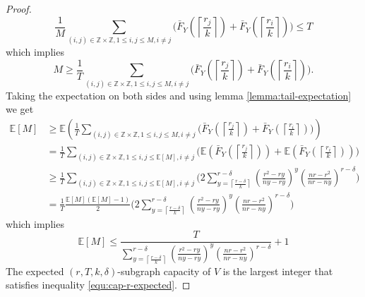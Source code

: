 \documentclass[10pt]{extarticle}
\newcommand{\Z}{\mathbb{Z}}
\theoremstyle{definition}
\begin{document}
\begin{proof}
\begin{equation*}
      \frac{1}{M} \sum_{(i,j) \in \Z\times\Z, 1 \le i,j \le M, i \ne j}  \Biggl( \bar{F}_Y\left(\left\lceil \frac{r_j}{k} \right\rceil\right) + \bar{F}_Y\left(\left\lceil \frac{r_i}{k} \right\rceil\right) \Biggr)  \le T 
\end{equation*}
\noindent which implies
\begin{equation}
\label{equ:cap-r}      
       M \geq \frac{1}{T}\sum_{(i,j) \in \Z\times\Z, 1 \le i,j \le M, i \ne j}  \Biggl( \bar{F}_Y\left(\left\lceil \frac{r_j}{k} \right\rceil\right) + \bar{F}_Y\left(\left\lceil \frac{r_i}{k} \right\rceil\right)\Biggr). 
\end{equation}
Taking the expectation on both sides and using lemma \ref{lemma:tail-expectation} we get
\begin{equation}
    \begin{split}
           \mathbb{E}[M] &\geq \mathbb{E} \left(\frac{1}{T}\sum_{(i,j) \in \Z\times\Z, 1 \le i,j \le M, i \ne j}  \Biggl( \bar{F}_Y\left(\left\lceil \frac{r_j}{k} \right\rceil\right) + \bar{F}_Y\left(\left\lceil \frac{r_i}{k} \right\rceil\right)\Biggr) \right) \\&= 
           \frac{1}{T}\sum_{(i,j) \in \Z\times\Z, 1 \le i,j \le \mathbb{E}[M], i \ne j}  \Biggl( \mathbb{E} \left( \bar{F}_Y\left(\left\lceil \frac{r_j}{k} \right\rceil\right) \right) + \mathbb{E} \left( \bar{F}_Y\left(\left\lceil \frac{r_i}{k} \right\rceil\right) \right)\Biggr) \\
           &\ge
           \frac{1}{T}\sum_{(i,j) \in \Z\times\Z, 1 \le i,j \le \mathbb{E}[M], i \ne j}  \Biggl( 2 \sum_{y = \left\lceil \frac{r-\delta}{k} \right\rceil}^{r-\delta}
           \left(\frac{r^2 - ry}{ny-ry}\right)^{y} \left(\frac{nr-r^2}{nr-ny}\right)^{r-\delta}\Biggr) \\
           &=\frac{1}{T} \frac{\mathbb{E}[M](\mathbb{E}[M]-1)}{2} \Biggl( 2 \sum_{y = \left\lceil \frac{r-\delta}{k} \right\rceil}^{r-\delta}
           \left(\frac{r^2 - ry}{ny-ry}\right)^{y} \left(\frac{nr-r^2}{nr-ny}\right)^{r-\delta}\Biggr) 
    \end{split}
    \end{equation}
which implies 
\begin{equation}
    \label{equ:cap-r-expected}     
    \mathbb{E} [M] \le \frac{T}{\sum_{y = \left\lceil \frac{r-\delta}{k} \right\rceil}^{r-\delta}
    \left(\frac{r^2 - ry}{ny-ry}\right)^{y} \left(\frac{nr-r^2}{nr-ny}\right)^{r-\delta}} + 1
\end{equation}
The expected $(r,T,k,\delta)$-subgraph capacity of $V$ is the largest integer that satisfies inequality \ref{equ:cap-r-expected}.
    
\end{proof}
\end{document}
